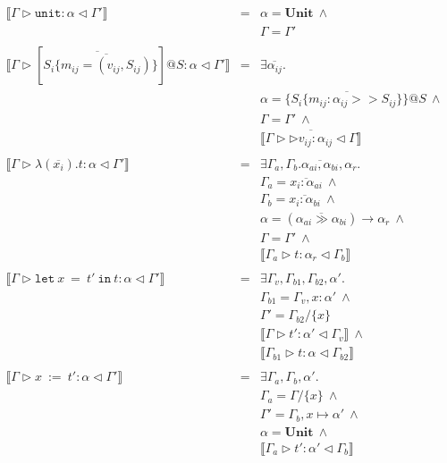 \documentclass{article}
\newcommand{\inferrule}[4]{\llbracket #1 \triangleright #2 : #3 \triangleleft #4 \rrbracket}
\newcommand{\inferlhs}[1]{\llbracket \Gamma \triangleright #1 : \alpha \triangleleft \Gamma' \rrbracket}
\newcommand{\unitv}{\mathtt{unit}}
\newcommand{\unitt}{\mathbf{Unit}}
\newcommand{\lett}[3]{\mathtt{let}\:#1\:\mathtt{=}\:#2\:\mathtt{in}\:#3}
\begin{document}
\[
\begin{array}{lll}

\inferlhs{\unitv}
& = & 
\alpha = \unitt\:\wedge 
\\ && 
\Gamma = \Gamma' 
\\
\\

\inferlhs{[ \overline{S_i \{ \overline{ m_{ij} = (v_{ij}, S_{ij}) } } \} ]@S}
& = & 
\exists \overline{\alpha_{ij}} .
\\ && 
\alpha = \{ \overline{ S_i \{ m_{ij} : \alpha_{ij} >> S_{ij} \} }\}@S\:\wedge
\\ && 
\Gamma = \Gamma'\:\wedge
\\ && 
\overline{\inferrule{\Gamma}{\triangleright v_{ij}}{\alpha_{ij}}{\Gamma}}
\\
\\

\inferlhs{\lambda ( \overline{x_i} ) . t}
& = &
\exists \Gamma_a, \Gamma_b . \overline{\alpha_{ai}, \alpha_{bi}}, \alpha_r . 
\\ && 
\Gamma_a = \overline{x_i : \alpha_{ai}}\:\wedge 
\\ && 
\Gamma_b = \overline{x_i : \alpha_{bi}}\:\wedge
\\ && 
\alpha = (\overline{\alpha_{ai} \gg \alpha_{bi}}) \rightarrow \alpha_r\:\wedge
\\ && 
\Gamma = \Gamma'\:\wedge
\\ && 
\inferrule{\Gamma_a}{t}{\alpha_r}{\Gamma_b} 
\\
\\

\inferlhs{\lett{x}{t'}{t}}
& = & 
\exists \Gamma_v, \Gamma_{b1}, \Gamma_{b2}, \alpha' . 
\\ && 
\Gamma_{b1} = \Gamma_v, x : \alpha'\:\wedge
\\ &&
\Gamma' = \Gamma_{b2} / \{ x \}
\\ &&
\inferrule{\Gamma}{t'}{\alpha'}{\Gamma_v}\:\wedge
\\ && 
\inferrule{\Gamma_{b1}}{t}{\alpha}{\Gamma_{b2}}
\\ && 
\\

\inferlhs{x\:\mathtt{:=}\:t'}
& = &
\exists \Gamma_a, \Gamma_b, \alpha' .
\\ &&
\Gamma_a = \Gamma / \{ x \}\:\wedge
\\ && 
\Gamma' = \Gamma_b, x \mapsto \alpha'\:\wedge
\\ && 
\alpha = \unitt\:\wedge
\\ && 
\inferrule{\Gamma_a}{t'}{\alpha'}{\Gamma_b}
\\
\\


\end{array}\]
\end{document}
